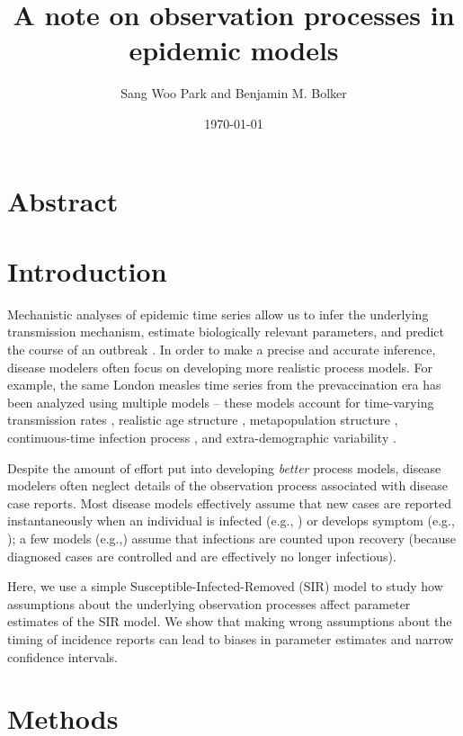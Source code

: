 \documentclass{article}\usepackage[]{graphicx}\usepackage[]{color}
\title{A note on observation processes in epidemic models}
\author{Sang Woo Park and Benjamin M. Bolker}
\date{\today}
\begin{document}
\maketitle

\section*{Abstract}



\section{Introduction}

Mechanistic analyses of epidemic time series allow us to infer the underlying 
transmission mechanism, estimate biologically relevant parameters, and 
predict the course of an outbreak \citep{breto2009time}. In order to make a 
precise and accurate inference, disease modelers often focus on developing
more realistic process models. For example, the same London measles time 
series from the prevaccination era has been analyzed using multiple models -- 
these models account for time-varying transmission rates \citep{fine1982measles}, 
realistic age structure \citep{schenzle1984age},
metapopulation structure \citep{xia2004measles}, continuous-time infection process 
\citep{cauchemez2008likelihood}, and extra-demographic variability \citep{he2009plug}. 

Despite the amount of effort put into developing \emph{better} process models, disease 
modelers often neglect details of the observation process associated with disease
case reports. Most disease models effectively assume that new cases are reported
instantaneously when an individual is infected (e.g., \cite{martinez2016differential, 
kennedy2018modeling, pons2018serotype}) or develops symptom (e.g., 
\cite{bhadra2011malaria, king2015avoidable}); 
a few models (e.g.,\cite{breto2009time, he2009plug, lin2016seasonality})
assume that infections are counted upon recovery (because diagnosed cases
are controlled and are effectively no longer infectious). 

Here, we use a simple Susceptible-Infected-Removed (SIR) model to study how 
assumptions about the underlying observation processes affect parameter estimates
of the SIR model. We show that making wrong assumptions about the timing of 
incidence reports can lead to biases in parameter estimates and narrow 
confidence intervals. 

\section{Methods}
\end{document}
